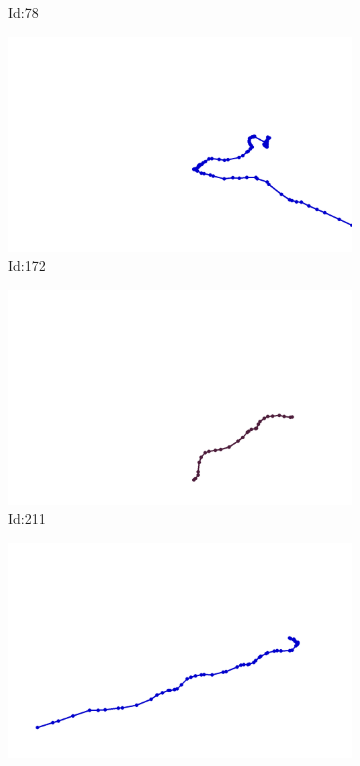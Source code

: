 \documentclass[12pt,twoside]{report}
\begin{document}
\begin{figure}
\begin{subfigure}[b]{0.20\textwidth}
\caption{Id:78}
\end{subfigure}
\begin{subfigure}[b]{0.20\textwidth}
\centering
\includegraphics[width=\textwidth]{../trajectories/172.png}
\caption{Id:172}
\end{subfigure}
\begin{subfigure}[b]{0.20\textwidth}
\centering
\includegraphics[width=\textwidth]{../trajectories/211.png}
\caption{Id:211}
\end{subfigure}
\begin{subfigure}[b]{0.20\textwidth}
\centering
\includegraphics[width=\textwidth]{../trajectories/249.png}

\end{subfigure}
\end{figure}
\end{document}
